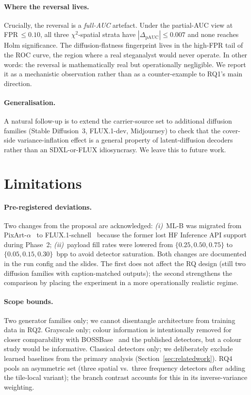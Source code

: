 \documentclass[10pt,twocolumn,a4paper]{article}
\begin{document}
\paragraph{Where the reversal lives.} Crucially, the reversal is a \emph{full-AUC} artefact. Under the partial-AUC view at FPR\,$\leq\!0.10$, all three $\chi^2$-spatial strata have $|\Delta_\text{pAUC}|\!\leq\!0.007$ and none reaches Holm significance. The diffusion-flatness fingerprint lives in the high-FPR tail of the ROC curve, the region where a real steganalyst would never operate. In other words: the reversal is mathematically real but operationally negligible. We report it as a mechanistic observation rather than as a counter-example to RQ1's main direction.

\paragraph{Generalisation.} A natural follow-up is to extend the carrier-source set to additional diffusion families (Stable Diffusion~3, FLUX.1-dev, Midjourney) to check that the cover-side variance-inflation effect is a general property of latent-diffusion decoders rather than an SDXL-or-FLUX idiosyncrasy. We leave this to future work.

\section{Limitations}
\label{sec:limitations}

\paragraph{Pre-registered deviations.} Two changes from the proposal are acknowledged: \textit{(i)}~ML-B was migrated from PixArt-$\alpha$~\cite{pixart2023} to FLUX.1-schnell~\cite{flux2024} because the former lost HF Inference API support during Phase~2; \textit{(ii)}~payload fill rates were lowered from $\{0.25,0.50,0.75\}$ to $\{0.05,0.15,0.30\}$~bpp to avoid detector saturation. Both changes are documented in the run config and the slides. The first does not affect the RQ design (still two diffusion families with caption-matched outputs); the second strengthens the comparison by placing the experiment in a more operationally realistic regime.

\paragraph{Scope bounds.} Two generator families only; we cannot disentangle architecture from training data in RQ2. Grayscale only; colour information is intentionally removed for closer comparability with BOSSBase~\cite{bas2011boss} and the published detectors, but a colour study would be informative. Classical detectors only; we deliberately exclude learned baselines from the primary analysis (Section~\ref{sec:relatedwork}). RQ4 pools an asymmetric set (three spatial vs.\ three frequency detectors after adding the tile-local variant); the branch contrast accounts for this in its inverse-variance weighting.
\end{document}
